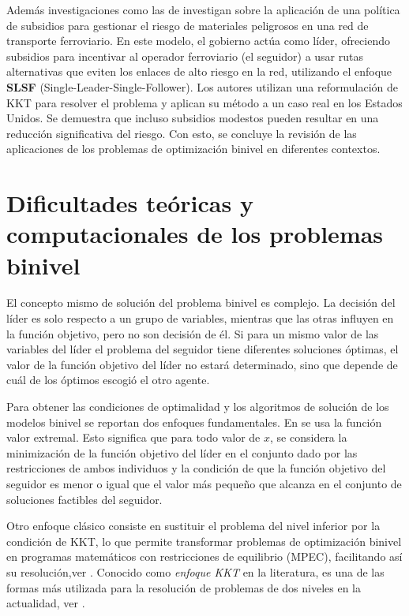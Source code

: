 Además investigaciones como las de \cite{Bhavsar2021ASP} investigan sobre la aplicación de una política de subsidios para gestionar el riesgo de materiales peligrosos en una red de transporte ferroviario. En este modelo, el gobierno actúa como líder, ofreciendo subsidios para incentivar al operador ferroviario (el seguidor) a usar rutas alternativas que eviten los enlaces de alto riesgo en la red, utilizando el enfoque \textbf{SLSF} (Single-Leader-Single-Follower). Los autores utilizan una reformulación de KKT para resolver el problema y aplican su método a un caso real en los Estados Unidos. Se demuestra que incluso subsidios modestos pueden resultar en una reducción significativa del riesgo.
Con esto, se concluye la revisión de las aplicaciones de los problemas de optimización binivel en diferentes contextos.

\section{Dificultades teóricas y computacionales de los problemas binivel}
El concepto mismo de solución del problema binivel es complejo. La decisión del líder es solo respecto a un grupo de variables, mientras que las otras influyen en la función objetivo, pero no son decisión de él. Si para un mismo valor de las variables del líder el problema del seguidor tiene diferentes soluciones óptimas, el valor de la función objetivo del líder no estará determinado, sino que depende de cuál de los óptimos escogió el otro agente. 

Para obtener las condiciones de optimalidad y los algoritmos de solución de los modelos binivel se reportan dos enfoques fundamentales. En \cite{DempeyZemkoho2020} se usa la función valor extremal. 
Esto significa que para todo valor de $x$, se considera la minimización de la función objetivo del líder en el conjunto dado por las restricciones de ambos individuos y la condición de que la función objetivo del seguidor es menor o igual que el valor más pequeño que alcanza en el conjunto de soluciones factibles del seguidor.
 
Otro enfoque clásico consiste en sustituir el problema del nivel inferior por la condición de KKT, lo que permite transformar problemas de optimización binivel en programas matemáticos con restricciones de equilibrio (MPEC), facilitando así su resolución,ver \cite{AnnotatedBibliographyDempe,Caselli2024BilevelOW,DempeyZemkoho2020}.
Conocido como \textit{enfoque KKT} en la literatura, es una de las formas más utilizada para la resolución de problemas de dos niveles en la actualidad, ver \cite{Aussel2021GenericityAO}.


